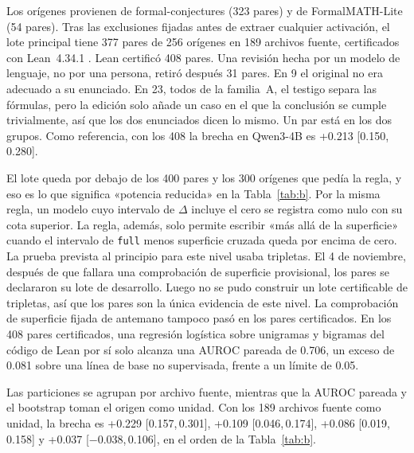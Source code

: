 \documentclass[10pt]{article}
\newcommand{\vr}[1]{\texttt{#1}}
\newcommand{\D}{\Delta}
\newcommand{\ic}[2]{[#1,\,#2]}
\begin{document}
Los orígenes provienen de formal-conjectures \citep{fc,fcpaper} (323 pares) y de
FormalMATH-Lite \citep{formalmath} (54 pares). Tras las exclusiones fijadas antes de extraer cualquier activación, el
lote principal tiene 377 pares de 256 orígenes en 189 archivos fuente, certificados con Lean~4.34.1 \citep{lean4,mathlib}.
Lean certificó 408 pares. Una revisión hecha por un modelo de lenguaje, no por una persona, retiró después 31 pares. En 9 el original no era
adecuado a su enunciado. En 23, todos de la familia~A, el testigo separa las fórmulas, pero la edición solo añade un
caso en el que la conclusión se cumple trivialmente, así que los dos enunciados dicen lo mismo. Un par está en los dos
grupos. Como referencia, con los 408 la brecha en Qwen3-4B es +0.213 \ic{0.150}{0.280}.

El lote queda por debajo de los 400 pares y los 300 orígenes que pedía la regla, y eso es lo que significa
«potencia reducida» en la Tabla~\ref{tab:b}. Por la misma regla, un modelo cuyo intervalo de $\D$ incluye el cero
se registra como nulo con su cota superior. La regla, además, solo permite escribir «más allá de la superficie»
cuando el intervalo de \vr{full} menos superficie cruzada queda por encima de cero. La prueba prevista al principio
para este nivel usaba tripletas. El 4 de noviembre, después de que fallara una comprobación de superficie provisional, los pares se declararon su lote de desarrollo. Luego no se pudo construir un lote certificable de tripletas, así que los pares son la única evidencia de este nivel. La comprobación de superficie fijada de antemano tampoco pasó en los pares certificados. En los 408 pares certificados, una regresión logística
sobre unigramas y bigramas del código de Lean por sí solo alcanza una AUROC pareada de 0.706, un exceso de 0.081 sobre una línea de base
no supervisada, frente a un límite de 0.05.

Las particiones se agrupan por archivo fuente, mientras que la AUROC pareada y el bootstrap toman el origen como
unidad. Con los 189 archivos fuente como unidad, la brecha es +0.229 \ic{0.157}{0.301}, +0.109 \ic{0.046}{0.174},
+0.086 \ic{0.019}{0.158} y +0.037 \ic{−0.038}{0.106}, en el orden de la Tabla~\ref{tab:b}.
\end{document}
